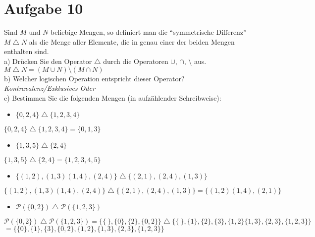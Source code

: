 \section*{Aufgabe 10}

Sind $M$ und $N$ beliebige Mengen, so definiert man die ``symmetrische Differenz'' $M \bigtriangleup N$ als die Menge aller Elemente, die in genau einer der beiden Mengen enthalten sind.\\

a) Drücken Sie den Operator $\bigtriangleup$ durch die Operatoren $\cup$, $\cap$, $\setminus$ aus.\\

$M \bigtriangleup N = (M \cup N) \setminus(M \cap N)$\\

b) Welcher logischen Operation entspricht dieser Operator?\\

\textit{Kontravalenz/Exklusives Oder}\\

c) Bestimmen Sie die folgenden Mengen (in aufzählender Schreibweise):

\begin{itemize}
\item $\{0, 2, 4\} \bigtriangleup \{1, 2, 3, 4\}$
\end{itemize}

$\{0, 2, 4\} \bigtriangleup \{1, 2, 3, 4\} = \{ 0, 1, 3 \}$

\begin{itemize}
\item $\{1, 3, 5\} \bigtriangleup \{2, 4\}$
\end{itemize}

$\{1, 3, 5\} \bigtriangleup \{2, 4\} = \{ 1, 2, 3, 4, 5 \}$

\begin{itemize}
\item $\{ (1,2), (1,3) (1,4), (2,4) \} \bigtriangleup \{ (2,1), (2,4), (1,3) \}$
\end{itemize}

$\{ (1,2), (1,3) (1,4), (2,4) \} \bigtriangleup \{ (2,1), (2,4), (1,3) \} = \{ (1,2) (1,4), (2,1) \} $

\begin{itemize}
\item $\mathcal{P}( \{0,2\} ) \bigtriangleup \mathcal{P}( \{1, 2, 3\} )$
\end{itemize}

$\mathcal{P}( \{0,2\} ) \bigtriangleup \mathcal{P}( \{1, 2, 3\} ) = \{ \{ \ \}, \{0\}, \{2\}, \{0, 2\}\} \bigtriangleup \{ \{ \ \}, \{1\}, \{2\}, \{3\}, \{1, 2\} \{1, 3\}, \{2, 3\}, \{1, 2, 3\} \}$\\
\hspace*{10.26em}$= \{ \{0\}, \{1\}, \{3\}, \{0,2\}, \{1,2\}, \{1,3\}, \{2,3\}, \{1,2,3\} \}$

\newpage
